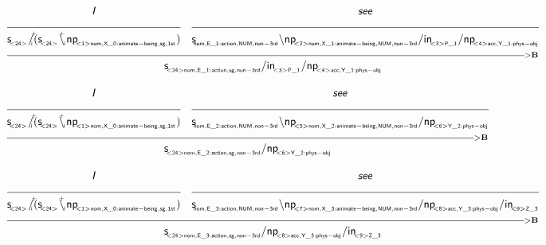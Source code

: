 \documentclass{article}
\newcommand{\deriv}[2]
{  \renewcommand{\arraystretch}{.5}
$\begin{array}[t]{*{#1}{c}}
     #2
   \end{array}$ }
\newcommand{\gf}[1]{\textsf{\textsl{#1}}}
\newcommand{\cf}[1]{\mbox{\ensuremath{\cfont{#1}}}}
\newcommand{\uline}[1]
{\mc{#1}{\hrulefill} }
\newcommand{\mc}[2]
  {\multicolumn{#1}{c}{#2}}
\newcommand{\cfont}{\mathsf}
\newcommand{\bs}{\backslash}
\newcommand{\subsa}[1]{\hspace{-0.75mm}_{_{#1}}}
\newcommand{\subsb}[1]{\hspace{-0.10mm}_{_{#1}}}
\newcommand{\subsf}[1]{\hspace{-0.75mm}_{_{#1}}}
\newcommand{\supsa}[1]{\hspace{-1.75mm}^{^{#1}} }
\newcommand{\supsb}[1]{\hspace{-0.80mm}^{^{#1}}  }
\begin{document}
\deriv{2}{
\gf{I} & \gf{see} \\
\uline{1} & \uline{1} \\
\cf{s \subsf{ < 24 > } / \supsb{+} \hspace{-1.45mm} \subsa{i} (s \subsf{ < 24 > } \bs \supsa{+} \hspace{-0.50mm} \subsb{i} np \subsf{   < 1 >  nom ,  X \_ 0:animate-being ,  sg ,  1st } )} & \cf{s \subsf{  nom ,  E \_ 1:action ,  NUM ,  non-3rd } \bs np \subsf{   < 2 >  nom ,  X \_ 1:animate-being ,  NUM ,  non-3rd } / in \subsf{   < 3 >  P \_ 1 } / np \subsf{   < 4 >  acc ,  Y \_ 1:phys-obj } } \\
 \mc{2} {\hrulefill_{>\mathbf{B}}}\\
 \mc{2}{\cf{s \subsf{   < 24 >  nom ,  E \_ 1:action ,  sg ,  non-3rd } / in \subsf{   < 3 >  P \_ 1 } / np \subsf{   < 4 >  acc ,  Y \_ 1:phys-obj } }} \\
}

\vspace{5mm}

\deriv{2}{
\gf{I} & \gf{see} \\
\uline{1} & \uline{1} \\
\cf{s \subsf{ < 24 > } / \supsb{+} \hspace{-1.45mm} \subsa{i} (s \subsf{ < 24 > } \bs \supsa{+} \hspace{-0.50mm} \subsb{i} np \subsf{   < 1 >  nom ,  X \_ 0:animate-being ,  sg ,  1st } )} & \cf{s \subsf{  nom ,  E \_ 2:action ,  NUM ,  non-3rd } \bs np \subsf{   < 5 >  nom ,  X \_ 2:animate-being ,  NUM ,  non-3rd } / np \subsf{   < 6 >  Y \_ 2:phys-obj } } \\
 \mc{2} {\hrulefill_{>\mathbf{B}}}\\
 \mc{2}{\cf{s \subsf{   < 24 >  nom ,  E \_ 2:action ,  sg ,  non-3rd } / np \subsf{   < 6 >  Y \_ 2:phys-obj } }} \\
}

\vspace{5mm}

\deriv{2}{
\gf{I} & \gf{see} \\
\uline{1} & \uline{1} \\
\cf{s \subsf{ < 24 > } / \supsb{+} \hspace{-1.45mm} \subsa{i} (s \subsf{ < 24 > } \bs \supsa{+} \hspace{-0.50mm} \subsb{i} np \subsf{   < 1 >  nom ,  X \_ 0:animate-being ,  sg ,  1st } )} & \cf{s \subsf{  nom ,  E \_ 3:action ,  NUM ,  non-3rd } \bs np \subsf{   < 7 >  nom ,  X \_ 3:animate-being ,  NUM ,  non-3rd } / np \subsf{   < 8 >  acc ,  Y \_ 3:phys-obj } / in \subsf{   < 9 >  Z \_ 3 } } \\
 \mc{2} {\hrulefill_{>\mathbf{B}}}\\
 \mc{2}{\cf{s \subsf{   < 24 >  nom ,  E \_ 3:action ,  sg ,  non-3rd } / np \subsf{   < 8 >  acc ,  Y \_ 3:phys-obj } / in \subsf{   < 9 >  Z \_ 3 } }} \\
}
\end{document}
